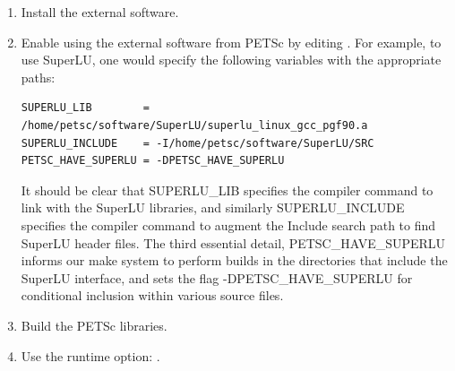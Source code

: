 \begin{enumerate}
\item Install the external software.
\item Enable using the external software from PETSc by editing .
   For example, to use SuperLU, one would specify the following variables with the appropriate paths:
{\footnotesize
\begin{verbatim}                       
SUPERLU_LIB        = /home/petsc/software/SuperLU/superlu_linux_gcc_pgf90.a 
SUPERLU_INCLUDE    = -I/home/petsc/software/SuperLU/SRC            
PETSC_HAVE_SUPERLU = -DPETSC_HAVE_SUPERLU        
\end{verbatim}
}
It should be clear that SUPERLU\_LIB specifies the compiler command to link with the SuperLU libraries, and 
similarly SUPERLU\_INCLUDE specifies the compiler command to augment the Include search path to find SuperLU
header files.  The third essential detail, PETSC\_HAVE\_SUPERLU informs our make system to perform builds
in the directories that include the SuperLU interface, and sets the flag -DPETSC\_HAVE\_SUPERLU for conditional
inclusion within various source files.

\item Build the PETSc libraries.
\item Use the runtime option:   .
\end{enumerate}

